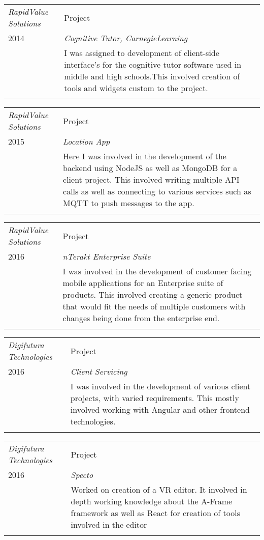 \documentclass[a4paper]{article}
\begin{document}
\begin{tabular}{p{4cm}|p{13cm}}
\emph{RapidValue Solutions} & Project \\
\textsc{2014} & \emph{Cognitive Tutor, CarnegieLearning} \\
& \normalsize{I was assigned to development of client-side interface's for the cognitive tutor software used in middle and high schools.This involved creation of tools and widgets custom to the project.
}
\\
\multicolumn{2}{c}{}
\end{tabular}

\begin{tabular}{p{4cm}|p{13cm}}
\emph{RapidValue Solutions} & Project \\
\textsc{2015} & \emph{Location App} \\
& \normalsize{Here I was involved in the development of the backend using NodeJS as well as MongoDB for a client project. This involved writing multiple API calls as well as connecting to various services such as MQTT to push messages to the app.
}
\\
\multicolumn{2}{c}{}
\end{tabular}

\begin{tabular}{p{4cm}|p{13cm}}
\emph{RapidValue Solutions} & Project \\
\textsc{2016} & \emph{nTerakt Enterprise Suite} \\
& \normalsize{I was involved in the development of customer facing mobile applications for an Enterprise suite of products. This involved creating a generic product that would fit the needs of multiple customers with changes being done from the enterprise end.
}
\\
\multicolumn{2}{c}{}
\end{tabular}

\begin{tabular}{p{4cm}|p{13cm}}
\emph{Digifutura Technologies} & Project \\
\textsc{2016} & \emph{Client Servicing} \\
& \normalsize{I was involved in the development of various client projects, with varied requirements. This mostly involved working with Angular and other frontend technologies. 
}
\\
\multicolumn{2}{c}{}
\end{tabular}

\begin{tabular}{p{4cm}|p{13cm}}
\emph{Digifutura Technologies} & Project \\
\textsc{2016} & \emph{Specto} \\
& \normalsize{ Worked on creation of a VR editor. It involved in depth working knowledge about the A-Frame framework as well as React for creation of tools involved in the editor
}
\\
\multicolumn{2}{c}{}
\end{tabular}
\end{document}
